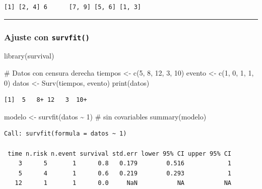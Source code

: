 \documentclass[
]{article}
\newenvironment{Shaded}{\begin{snugshade}}{\end{snugshade}}
\newcommand{\CommentTok}[1]{\textcolor[rgb]{0.37,0.37,0.37}{#1}}
\newcommand{\DecValTok}[1]{\textcolor[rgb]{0.68,0.00,0.00}{#1}}
\newcommand{\FunctionTok}[1]{\textcolor[rgb]{0.28,0.35,0.67}{#1}}
\newcommand{\NormalTok}[1]{\textcolor[rgb]{0.00,0.23,0.31}{#1}}
\newcommand{\OtherTok}[1]{\textcolor[rgb]{0.00,0.23,0.31}{#1}}
\newcommand{\SpecialCharTok}[1]{\textcolor[rgb]{0.37,0.37,0.37}{#1}}
\begin{document}
\begin{verbatim}
[1] [2, 4] 6      [7, 9] [5, 6] [1, 3]
\end{verbatim}

\begin{center}\rule{0.5\linewidth}{0.5pt}\end{center}

\subsubsection{\texorpdfstring{Ajuste con
\texttt{survfit()}}{Ajuste con survfit()}}\label{ajuste-con-survfit}

\begin{Shaded}
\begin{Highlighting}[]
\FunctionTok{library}\NormalTok{(survival)}

\CommentTok{\# Datos con censura derecha}
\NormalTok{tiempos }\OtherTok{\textless{}{-}} \FunctionTok{c}\NormalTok{(}\DecValTok{5}\NormalTok{, }\DecValTok{8}\NormalTok{, }\DecValTok{12}\NormalTok{, }\DecValTok{3}\NormalTok{, }\DecValTok{10}\NormalTok{)}
\NormalTok{evento }\OtherTok{\textless{}{-}} \FunctionTok{c}\NormalTok{(}\DecValTok{1}\NormalTok{, }\DecValTok{0}\NormalTok{, }\DecValTok{1}\NormalTok{, }\DecValTok{1}\NormalTok{, }\DecValTok{0}\NormalTok{)}
\NormalTok{datos }\OtherTok{\textless{}{-}} \FunctionTok{Surv}\NormalTok{(tiempos, evento)}
\FunctionTok{print}\NormalTok{(datos)}
\end{Highlighting}
\end{Shaded}

\begin{verbatim}
[1]  5   8+ 12   3  10+
\end{verbatim}

\begin{Shaded}
\begin{Highlighting}[]
\NormalTok{modelo }\OtherTok{\textless{}{-}} \FunctionTok{survfit}\NormalTok{(datos }\SpecialCharTok{\textasciitilde{}} \DecValTok{1}\NormalTok{)  }\CommentTok{\# sin covariables}
\FunctionTok{summary}\NormalTok{(modelo)}
\end{Highlighting}
\end{Shaded}

\begin{verbatim}
Call: survfit(formula = datos ~ 1)

 time n.risk n.event survival std.err lower 95% CI upper 95% CI
    3      5       1      0.8   0.179        0.516            1
    5      4       1      0.6   0.219        0.293            1
   12      1       1      0.0     NaN           NA           NA
\end{verbatim}
\end{document}
